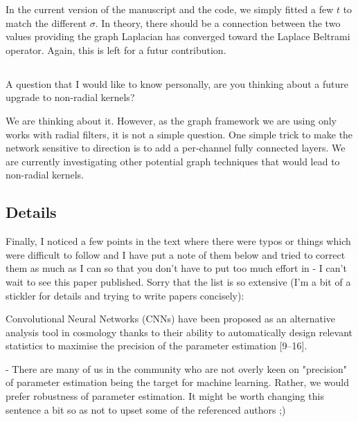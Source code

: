 \documentclass[12pt,a4paper]{article}
\newcommand{\todo}[1]{{\color[rgb]{.6,.1,.6}{TODO: #1}}}
\newcommand{\1}{\b{1}}              %
\newcommand{\0}{\b{0}}              %
\begin{document}
In the current version of the manuscript and the code, we simply fitted a few $t$ to match the different $\sigma$. In theory, there should be a connection between the two values providing the graph Laplacian has converged toward the Laplace Beltrami operator. Again, this is left for a futur contribution.

\subsection{}
\begin{mdframed}[style=comment]
A question that I would like to know personally, are you thinking about a future upgrade to non-radial kernels?
\end{mdframed}
We are thinking about it. However, as the graph framework we are using only works with radial filters, it is not a simple question. One simple trick to make the network sensitive to direction is to add a per-channel fully connected layers. We are currently investigating other potential graph techniques that would lead to non-radial kernels.


\subsection{Details}
\begin{mdframed}[style=comment]
Finally, I noticed a few points in the text where there were typos or things which were difficult to follow and I have put a note of them below and tried to correct them as much as I can so that you don't have to put too much effort in - I can't wait to see this paper published. Sorry that the list is so extensive (I'm a bit of a stickler for details and trying to write papers concisely):
\end{mdframed}
\todo{Assigned @tomek.
This reviewer really spend the time. Should we say something here?}

\begin{mdframed}[style=comment]
Convolutional Neural Networks (CNNs) have been proposed as an alternative analysis tool in cosmology thanks to their ability to automatically design relevant statistics to maximise the precision of the parameter estimation [9–16].

- There are many of us in the community who are not overly keen on "precision" of parameter estimation being the target for machine learning. Rather, we would prefer robustness of parameter estimation. It might be worth changing this sentence a bit so as not to upset some of the referenced authors ;)
\end{mdframed}
\todo{Assigned: @tomek, @michael}
\end{document}
